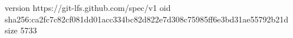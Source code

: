 version https://git-lfs.github.com/spec/v1
oid sha256:ca2fc7c82cf081dd01acc334bc82d822e7d308c75985ff6e3bd31ae55792b21d
size 5733
